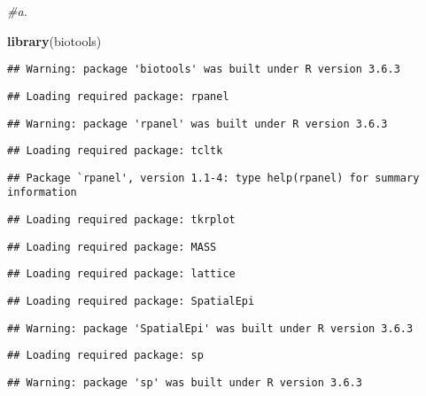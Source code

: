 \documentclass[
]{article}
\newenvironment{Shaded}{\begin{snugshade}}{\end{snugshade}}
\newcommand{\CommentTok}[1]{\textcolor[rgb]{0.56,0.35,0.01}{\textit{#1}}}
\newcommand{\KeywordTok}[1]{\textcolor[rgb]{0.13,0.29,0.53}{\textbf{#1}}}
\newcommand{\NormalTok}[1]{#1}
\begin{document}
\begin{Shaded}
\begin{Highlighting}[]
\CommentTok{#a.}

\KeywordTok{library}\NormalTok{(biotools)}
\end{Highlighting}
\end{Shaded}

\begin{verbatim}
## Warning: package 'biotools' was built under R version 3.6.3
\end{verbatim}

\begin{verbatim}
## Loading required package: rpanel
\end{verbatim}

\begin{verbatim}
## Warning: package 'rpanel' was built under R version 3.6.3
\end{verbatim}

\begin{verbatim}
## Loading required package: tcltk
\end{verbatim}

\begin{verbatim}
## Package `rpanel', version 1.1-4: type help(rpanel) for summary information
\end{verbatim}

\begin{verbatim}
## Loading required package: tkrplot
\end{verbatim}

\begin{verbatim}
## Loading required package: MASS
\end{verbatim}

\begin{verbatim}
## Loading required package: lattice
\end{verbatim}

\begin{verbatim}
## Loading required package: SpatialEpi
\end{verbatim}

\begin{verbatim}
## Warning: package 'SpatialEpi' was built under R version 3.6.3
\end{verbatim}

\begin{verbatim}
## Loading required package: sp
\end{verbatim}

\begin{verbatim}
## Warning: package 'sp' was built under R version 3.6.3
\end{verbatim}
\end{document}

